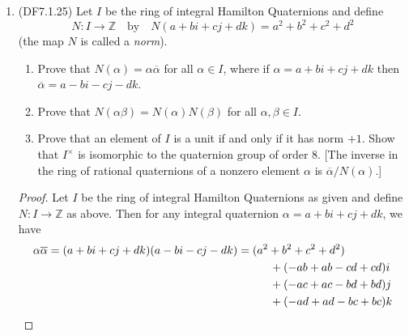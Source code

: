 \documentclass[11pt]{article}
\begin{document}
\begin{enumerate}
\begin{proof}
        We have that the quotient group $\mathcal{O}/\mathcal{O}^{\prime}$ has order $f$, so that for any element $a+b\omega$ of $\mathcal{O}$, the coset $f(a+b\omega) + \mathcal{O}^{\prime}$ (where $f(a+b\omega)$ denotes the $f$-fold sum given by $af + bf\omega$) is equivalent to the coset $\mathcal{O}^{\prime}$. Furthermore, since $(f-1)a\in\mathcal{O}^{\prime}$, it follows that $(af + bf\omega) +\mathcal{O}^{\prime} = ((f-1)a + 0f\omega) + \mathcal{O}^{\prime}$, which is equivalent to saying that \[(af + bf\omega) - ((f-1)a + 0f\omega) = a+bf\omega \in \mathcal{O}^{\prime n}.\] Since $a,b$ were arbitrary, it follows that $\mathcal{O}_f$ is contained in $\mathcal{O}^{\prime}$. Then \[f = [\mathcal{O}\colon\mathcal{O}^{\prime}] = [\mathcal{O}\colon\mathcal{O}_f][\mathcal{O}_f\colon \mathcal{O}^{\prime}] = f [\mathcal{O}_f\colon \mathcal{O}^{\prime}],\] so that $[\mathcal{O}_f\colon \mathcal{O}^{\prime}] = 1$ and so $\mathcal{O}^{\prime} = \mathcal{O}_f$. Hence any subring of $\mathcal{O}$ containing the identity and having finite index $f$ in $\mathcal{O}$ is equal to $\mathcal{O}_f$.
    \end{proof}
    \item (DF7.1.25) Let $I$ be the ring of integral Hamilton Quaternions and define \[N\colon I\to \mathbb{Z}\quad \text{by} \quad N(a+bi+cj+dk) = a^2 + b^2 + c^2 + d^2\](the map $N$ is called a \textit{norm}).\begin{enumerate}[label=\textbf{(\alph*)}]
        \item Prove that $N(\alpha) = \alpha\overline{\alpha}$ for all $\alpha\in I$, where if $\alpha = a+bi+cj+dk$ then $\overline{\alpha} = a-bi-cj-dk$.
        \item Prove that $N(\alpha\beta) = N(\alpha)N(\beta)$ for all $\alpha, \beta \in I$.
        \item Prove that an element of $I$ is a unit if and only if it has norm $+1$. Show that $I^{\times}$ is isomorphic to the quaternion group of order $8$. [The inverse in the ring of rational quaternions of a nonzero element $\alpha$ is $\overline{\alpha}/N(\alpha)$.]
    \end{enumerate}
    \begin{proof}
        Let $I$ be the ring of integral Hamilton Quaternions as given and define $N\colon I\to \mathbb{Z}$ as above. Then for any integral quaternion $\alpha = a+bi+cj+dk$, we have \begin{align*}
            \alpha\overline{\alpha} = (a+bi+cj+dk)(a-bi-cj-dk) &= (a^2+b^2+c^2+d^2)\\ &\hspace*{1cm}+ (-ab+ab-cd+cd)i\\ &\hspace*{1cm}+(-ac+ac-bd+bd)j \\ &\hspace*{1cm}+(-ad+ad-bc+bc)k\\

\end{align*}
\end{proof}
\end{enumerate}
\end{document}
